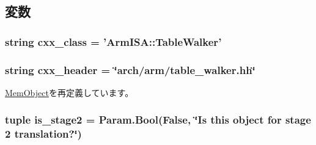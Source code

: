 \subsection{変数}
\hypertarget{classArmTLB_1_1ArmTableWalker_a58cd55cd4023648e138237cfc0822ae3}{
\subsubsection[{cxx\_\-class}]{\setlength{\rightskip}{0pt plus 5cm}string {\bf cxx\_\-class} = '{\bf ArmISA::TableWalker}'}}
\label{classArmTLB_1_1ArmTableWalker_a58cd55cd4023648e138237cfc0822ae3}
\hypertarget{classArmTLB_1_1ArmTableWalker_a17da7064bc5c518791f0c891eff05fda}{
\subsubsection[{cxx\_\-header}]{\setlength{\rightskip}{0pt plus 5cm}string {\bf cxx\_\-header} = \char`\"{}arch/arm/table\_\-walker.hh\char`\"{}}}
\label{classArmTLB_1_1ArmTableWalker_a17da7064bc5c518791f0c891eff05fda}


\hyperlink{classMemObject_1_1MemObject_a17da7064bc5c518791f0c891eff05fda}{MemObject}を再定義しています。\hypertarget{classArmTLB_1_1ArmTableWalker_a79c1ca5c107632a64c9583c96fbcc282}{
\subsubsection[{is\_\-stage2}]{\setlength{\rightskip}{0pt plus 5cm}tuple {\bf is\_\-stage2} = Param.Bool(False, \char`\"{}Is this object for stage 2 translation?\char`\"{})}}
\label{classArmTLB_1_1ArmTableWalker_a79c1ca5c107632a64c9583c96fbcc282}



